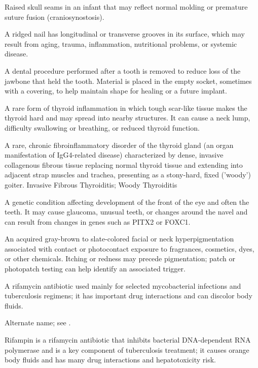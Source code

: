  Raised skull seams in an infant that may reflect normal molding or premature suture fusion (craniosynostosis).

 A ridged nail has longitudinal or transverse grooves in its surface, which may result from aging, trauma, inflammation, nutritional problems, or systemic disease.

 A dental procedure performed after a tooth is removed to reduce loss of the jawbone that held the tooth. Material is placed in the empty socket, sometimes with a covering, to help maintain shape for healing or a future implant.

 A rare form of thyroid inflammation in which tough scar-like tissue makes the thyroid hard and may spread into nearby structures. It can cause a neck lump, difficulty swallowing or breathing, or reduced thyroid function.

 A rare, chronic fibroinflammatory disorder of the thyroid gland (an organ manifestation of IgG4-related disease) characterized by dense, invasive collagenous fibrous tissue replacing normal thyroid tissue and extending into adjacent strap muscles and trachea, presenting as a stony-hard, fixed ('woody') goiter.
\synonyms
Invasive Fibrous Thyroiditis; Woody Thyroiditis

 A genetic condition affecting development of the front of the eye and often the teeth. It may cause glaucoma, unusual teeth, or changes around the navel and can result from changes in genes such as PITX2 or FOXC1.

 An acquired gray-brown to slate-colored facial or neck hyperpigmentation associated with contact or photocontact exposure to fragrances, cosmetics, dyes, or other chemicals. Itching or redness may precede pigmentation; patch or photopatch testing can help identify an associated trigger.

 A rifamycin antibiotic used mainly for selected mycobacterial infections and tuberculosis regimens; it has important drug interactions and can discolor body fluids.

 Alternate name; see .

 Rifampin is a rifamycin antibiotic that inhibits bacterial DNA-dependent RNA polymerase and is a key component of tuberculosis treatment; it causes orange body fluids and has many drug interactions and hepatotoxicity risk.

